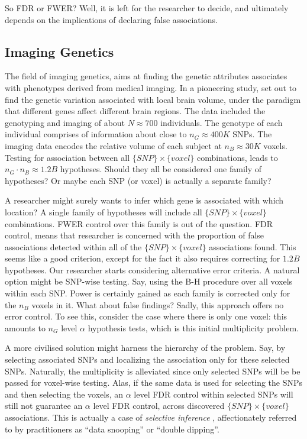 \documentclass[review,12pt]{article}
\begin{document}
So FDR or FWER? Well, it is left for the researcher to decide, and ultimately depends on the implications of declaring false associations. 





\subsection{\label{eg:imaging_genetics}Imaging Genetics}

The field of imaging genetics, aims at finding the genetic attributes associates with phenotypes derived from medical imaging. In a pioneering study, \citet{stein_voxelwise_2010} set out to find the genetic variation associated with local brain volume, under the paradigm that different genes affect different brain regions. 
The data included the genotyping and imaging of about $N \approx 700$ individuals. 
The genotype of each individual comprises of information about close to $n_G \approx 400K$ SNPs. 
The imaging data encodes the relative volume of each subject at $n_B \approx 30K$ voxels. 
Testing for association between all $\{SNP\} \times \{voxel\}$ combinations, leads to $n_G \cdot n_B \approx 1.2B$ hypotheses. Should they all be considered one family of hypotheses? Or maybe each SNP (or voxel) is actually a separate family? 

A researcher might surely wants to infer which gene is associated with which location? 
A single family of hypotheses will include all $\{SNP\} \times \{voxel\}$ combinations. 
FWER control over this family is out of the question. 
FDR control, means that researcher is concerned with the proportion of false associations detected within all of the $\{SNP\} \times \{voxel\}$ associations found. This seems like a good criterion, except for the fact it also requires correcting for $1.2B$ hypotheses. 
Our researcher starts considering alternative error criteria. 
A natural option might be SNP-wise testing. Say, using the B-H procedure over all voxels within each SNP. Power is certainly gained as each family is corrected only for the $n_B$ voxels in it. 
What about false findings? Sadly, this approach offers no error control. To see this, consider the case where there is only one voxel: this amounts to $n_G$ level $\alpha$ hypothesis tests, which is this initial multiplicity problem. 

A more civilised solution might harness the hierarchy of the problem. Say, by selecting associated SNPs and localizing the association only for these selected SNPs. 
Naturally, the multiplicity is alleviated since only selected SNPs will be be passed for voxel-wise testing. Alas, if the same data is used for selecting the SNPs and then selecting the voxels, an $\alpha$ level FDR control within selected SNPs will still not guarantee an $\alpha$ level FDR control, across discovered $\{SNP\} \times \{voxel\}$ associations. This is actually a case of \emph{selective inference} \citep{benjamini_simultaneous_2010}, affectionately referred to by practitioners as ``data snooping'' or ``double dipping''. 
\end{document}
